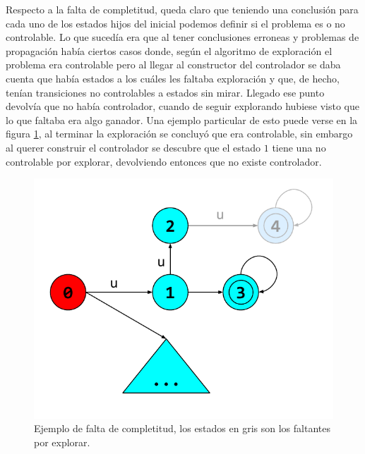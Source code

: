 Respecto a la falta de completitud, queda claro que teniendo una conclusión para cada uno de los estados hijos del inicial podemos definir si el problema es o no controlable. Lo que sucedía era que al tener conclusiones erroneas y problemas de propagación había ciertos casos donde, según el algoritmo de exploración el problema era controlable pero al llegar al constructor del controlador se daba cuenta que había estados a los cuáles les faltaba exploración y que, de hecho, tenían transiciones no controlables a estados sin mirar. Llegado ese punto devolvía que no había controlador, cuando de seguir explorando hubiese visto que lo que faltaba era algo ganador. Una ejemplo particular de esto puede verse en la figura \ref{fig:faltaCompletitud}, al terminar la exploración se concluyó que era controlable, sin embargo al querer construir el controlador se descubre que el estado $1$ tiene una no controlable por explorar, devolviendo entonces que no existe controlador.
\begin{figure}[htb]
 \centering
 \includegraphics[width=\linewidth/2]{figures/faltaDeCompletitud.pdf}
 \caption{Ejemplo de falta de completitud, los estados en gris son los faltantes por explorar.}
 \label{fig:faltaCompletitud}
\end{figure}


    

